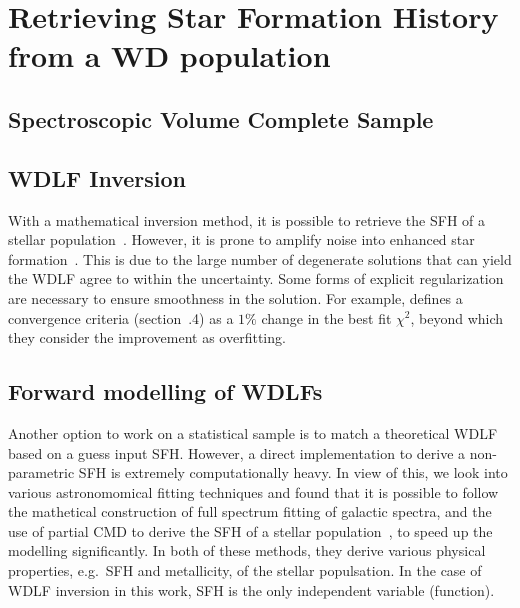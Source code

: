 \documentclass[fleqn,usenatbib]{mnras}
\begin{document}
\section{Retrieving Star Formation History from a WD population}

\citep{1990ApJ...352..605N}
\citep{1992ApJ...386..539W}

\subsection{Spectroscopic Volume Complete Sample}

\citep{2014ApJ...791...92T}
\citep{2019ApJ...878L..11I}


\subsection{WDLF Inversion}
With a mathematical inversion method, it is possible to retrieve the SFH of a
stellar population~\citep{2013MNRAS.434.1549R}. However, it is prone to amplify
noise into enhanced star formation~\citep{2014ApJ...791...92T}. This is due to
the large number of degenerate solutions that can yield the WDLF agree to
within the uncertainty. Some forms of explicit regularization are necessary
to ensure smoothness in the solution. For example, \citet{2013MNRAS.434.1549R}
defines a convergence criteria (section~.4)
as a $1\%$ change in the best fit $\chi^2$, beyond which they consider the
improvement as overfitting.

\subsection{Forward modelling of WDLFs}
Another option to work on a statistical sample is to match a theoretical
WDLF based on a guess input SFH. However, a direct implementation to
derive a non-parametric SFH is extremely computationally heavy. In view of
this, we look into various astronomomical fitting techniques and found that
it is possible to follow the mathetical construction of full spectrum
fitting of galactic spectra, and the use of partial CMD to derive the SFH
of a stellar population~\citep{2006A&A...459..783C}, to speed up the
modelling significantly. In both of these methods, they derive various
physical properties, e.g.\ SFH and metallicity, of the stellar populsation.
In the case of WDLF inversion in this
work, SFH is the only independent variable (function).
\end{document}
